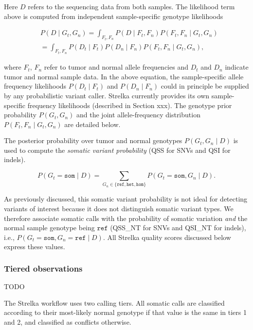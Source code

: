 \documentclass{article}
\begin{document}
Here $D$ refers to the sequencing data from both samples. The likelihood term above is computed from independent sample-specific genotype likelihoods

\begin{align*}
	& P(D \mid G_t,G_n) = \int_{F_t,F_n}{P(D \mid F_t,F_n)P(F_t,F_n \mid G_t,G_n)} \\
	& = \int_{F_t,F_n}{P(D_t \mid F_t)P(D_n \mid F_n)P(F_t,F_n \mid G_t,G_n)},
\end{align*}

\noindent where $F_t$, $F_n$ refer to tumor and normal allele frequencies and $D_t$ and $D_n$ indicate tumor and normal sample data. In the above equation, the sample-specific allele frequency likelihoods $P(D_t \mid F_t)$ and $P(D_n \mid F_n)$ could in principle be supplied by any probabilistic variant caller. Strelka currently provides its own sample-specific frequency likelihoods (described in Section xxx). The genotype prior probability $P(G_t, G_n)$ and the joint allele-frequency distribution $P(F_t,F_n \mid G_t,G_n)$ are detailed below.

The posterior probability over tumor and normal genotypes $P(G_t,G_n \mid D)$ is used to compute the {\em somatic variant probability} (QSS for SNVs and QSI for indels).

\begin{equation}
\label{eqn:somVarProb}
	P(G_t = \texttt{som} \mid D) = \sum_{G_n \in \{ \texttt{ref}, \texttt{het}, \texttt{hom} \}}{P(G_t=\texttt{som},G_n \mid D)}.
\end{equation}

As previously discussed, this somatic variant probability is not ideal for detecting variants of interest because it does not distinguish somatic variant types. We therefore associate somatic calls with the probability of somatic variation {\em and} the normal sample genotype being $\texttt{ref}$ (QSS\_NT for SNVs and QSI\_NT for indels), i.e., $P(G_t = \texttt{som}, G_n = \texttt{ref} \mid D)$. All Strelka quality scores discussed below express these values.


\subsubsection{Tiered observations}
\label{sec:somatic_tiers}

TODO

The Strelka workflow uses two calling tiers. All somatic calls are classified according to their most-likely normal genotype if that value is the same in tiers 1 and 2, and classified as conflicts otherwise.
\end{document}
